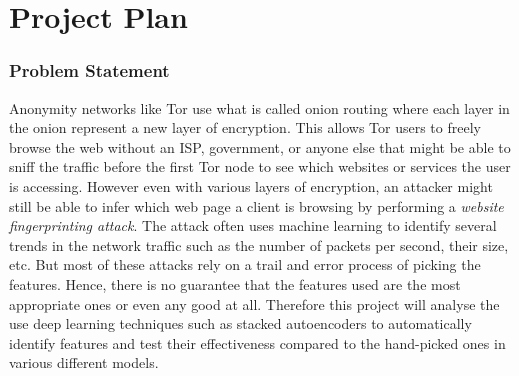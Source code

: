 \newpage
\chapter{Project Plan}

\setcounter{secnumdepth}{5}
\begingroup

\renewcommand{\thesubsection}{\arabic{subsection}}

\renewcommand{\addcontentsline}[3]{}%

\subsection{Problem Statement}
Anonymity networks like Tor use what is called onion routing where each layer in the onion represent a new layer of encryption.
This allows Tor users to freely browse the web without an ISP, government, or anyone else that might be able to sniff the traffic before the first Tor node to see which websites or services the user is accessing.
However even with various layers of encryption, an attacker might still be able to infer which web page a client is browsing by performing a \textit{website fingerprinting attack}.
The attack often uses machine learning to identify several trends in the network traffic such as the number of packets per second, their size, etc.
But most of these attacks rely on a trail and error process of picking the features.
Hence, there is no guarantee that the features used are the most appropriate ones or even any good at all.
Therefore this project will analyse the use deep learning techniques such as stacked autoencoders to automatically identify features and test their effectiveness compared to the hand-picked ones in various different models.


